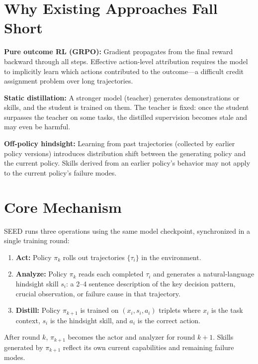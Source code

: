 \documentclass[10pt,twocolumn]{article}
\begin{document}
\section{Why Existing Approaches Fall Short}

\textbf{Pure outcome RL (GRPO):} Gradient propagates from the final
reward backward through all steps. Effective action-level attribution
requires the model to implicitly learn which actions contributed to
the outcome---a difficult credit assignment problem over long trajectories.

\textbf{Static distillation:} A stronger model (teacher) generates
demonstrations or skills, and the student is trained on them. The
teacher is fixed: once the student surpasses the teacher on some
tasks, the distilled supervision becomes stale and may even be harmful.

\textbf{Off-policy hindsight:} Learning from past trajectories
(collected by earlier policy versions) introduces distribution shift
between the generating policy and the current policy. Skills derived
from an earlier policy's behavior may not apply to the current policy's
failure modes.

\section{Core Mechanism}

SEED runs three operations using the same model checkpoint, synchronized
in a single training round:

\begin{enumerate}[itemsep=2pt,parsep=0pt]
  \item \textbf{Act:} Policy $\pi_k$ rolls out trajectories
    $\{\tau_i\}$ in the environment.
  \item \textbf{Analyze:} Policy $\pi_k$ reads each completed
    $\tau_i$ and generates a natural-language hindsight skill $s_i$:
    a 2--4 sentence description of the key decision pattern, crucial
    observation, or failure cause in that trajectory.
  \item \textbf{Distill:} Policy $\pi_{k+1}$ is trained on
    $(x_i, s_i, a_i)$ triplets where $x_i$ is the task context,
    $s_i$ is the hindsight skill, and $a_i$ is the correct action.
\end{enumerate}

After round $k$, $\pi_{k+1}$ becomes the actor and analyzer for
round $k+1$. Skills generated by $\pi_{k+1}$ reflect its own
current capabilities and remaining failure modes.
\end{document}
